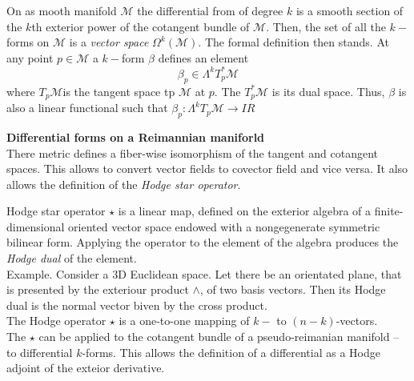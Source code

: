 \documentclass[11pt,a4paper,headinclude=true,DIV=14,BCOR=8mm,chapterprefix,listof=totoc,twoside,openright,abstracton]{scrbook}
\begin{document}
\begin{sidenote}
    On as mooth manifold $\mathcal{M}$ the differential from of degree $k$ is a smooth section of the $k$th exterior power of the cotangent bundle of $\mathcal{M}$. Then, the set of all the $k-$forms on $\mathcal{M}$ is a \textit{vector space} $\Omega^k(\mathcal{M})$. The formal definition then stands. At any point $p\in \mathcal{M}$ a $k-$form $\beta$ defines an element 
    \begin{equation}
        \beta_p\in\Lambda^kT^* _p \mathcal{M}
    \end{equation}
    where $T_p\mathcal{M}$is the tangent space tp $\mathcal{M}$ at $p$. The $T^* _p \mathcal{M}$ is its dual space. Thus, $\beta$ is also a linear functional such that $\beta_p:\Lambda^k T_p \mathcal{M}\rightarrow I\!R$
\end{sidenote}

\begin{sidenote}
    \textbf{Differential forms on a Reimannian maniforld} \\
    There metric defines a fiber-wise isomorphism of the tangent and cotangent spaces. This allows to convert vector fields to covector field and vice versa. It also allows the definition of the \textit{Hodge star operator}.
    
    Hodge star operator $\star$ is a linear map, defined on the exterior algebra of a finite-dimensional oriented vector space endowed with a nongegenerate symmetric bilinear form. Applying the operator to the element of the algebra produces the \textit{Hodge dual} of the element. \\
    
    Example. Consider a 3D Euclidean space. Let there be an orientated plane, that is presented by the exteriour product $\wedge$, of two basis vectors. Then its Hodge dual is the normal vector biven by the cross product. \\
    The Hodge operator $\star$ is a one-to-one mapping of $k-$ to $(n-k)$-vectors.\\
    
    The $\star$ can be applied to the cotangent bundle of a pseudo-reimanian manifold -- to differential $k$-forms. This allows the definition of a differential as a Hodge adjoint of the exteior derivative. 
    

\end{sidenote}
\end{document}
